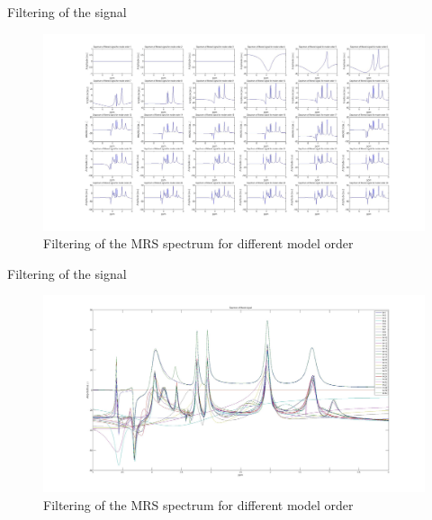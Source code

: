 \documentclass[t,12pt,english
\ifx\beamermode\undefined\else,\beamermode\fi
]{beamer}
\begin{document}
\begin{frame}{Filtering of the signal}
\begin{figure}[!htbp]
\centering
\includegraphics[width=1\textwidth]{8_2.jpg}
\caption{\tiny{Filtering of the MRS spectrum for different model order}}
\end{figure}   
\end{frame}

\begin{frame}{Filtering of the signal}
\begin{figure}[!htbp]
\centering
\includegraphics[width=1\textwidth]{8.jpg}
\caption{\tiny{Filtering of the MRS spectrum for different model order}}
\end{figure}   
\end{frame}
\end{document}
